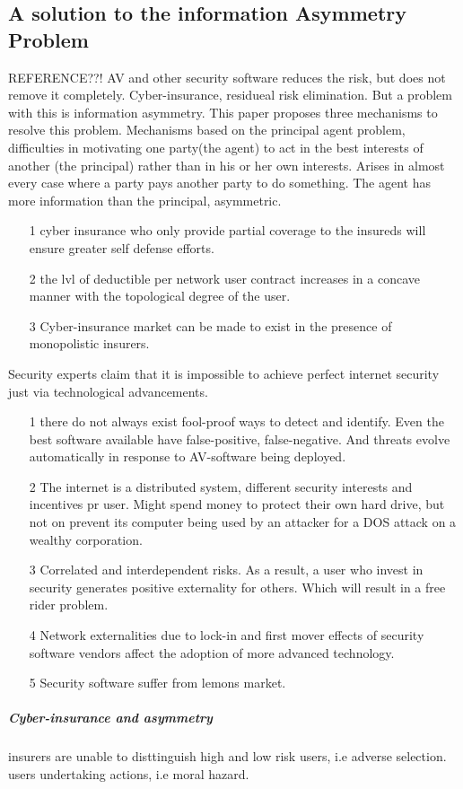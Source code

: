 \subsection{A solution to the information Asymmetry Problem}
REFERENCE??! 
AV and other security software reduces the risk, but does not remove it completely. Cyber-insurance,
 residueal risk elimination. But a problem with this is information asymmetry. This paper proposes
  three mechanisms to resolve this problem. Mechanisms based on the principal agent problem,
   difficulties in motivating one party(the agent) to act in the best interests of another 
   (the principal) rather than in his or her own interests. Arises in almost every case where a party
    pays another party to do something. The agent has more information than the principal, asymmetric.
\begin{itemize}
 \item[1] cyber insurance who only provide partial coverage to the insureds will ensure greater self defense efforts.
 \item[2] the lvl of deductible per network user contract increases in a concave manner with the topological degree of the user.
 \item[3] Cyber-insurance market can be made to exist in the presence of monopolistic insurers.
 
\end{itemize} 
Security experts claim that it is impossible to achieve perfect internet security just via technological advancements.
\begin{itemize}
\item[1] there do not always exist fool-proof ways to detect and identify. 
Even the best software available have false-positive, false-negative. And threats evolve automatically in response to AV-software being deployed. 
\item[2] The internet is a distributed system, different security interests and incentives pr user.
 Might spend money to protect their own hard drive, but not on prevent its computer being used by an
  attacker for a DOS attack on a wealthy corporation. 
\item[3] Correlated and interdependent risks. As a result, a user who invest in security generates
 positive externality for others. Which will result in a free rider problem.
\item[4] Network externalities due to lock-in and first mover effects of security software vendors
 affect the adoption of more advanced technology.
\item[5] Security software suffer from lemons market. 
\end{itemize}
 \subparagraph{Cyber-insurance and asymmetry}
 insurers are unable to disttinguish high and low risk users, i.e adverse selection.
 users undertaking actions, i.e moral hazard. 
 
